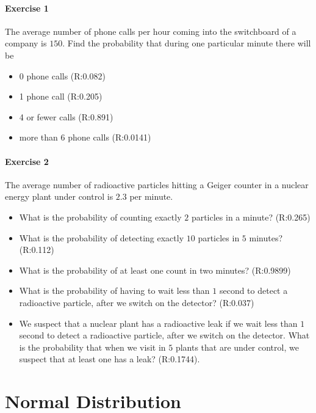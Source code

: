 \documentclass[
]{book}
\providecommand{\tightlist}{%
  \setlength{\itemsep}{0pt}\setlength{\parskip}{0pt}}
\begin{document}
\hypertarget{exercise-1-5}{%
\subsubsection{Exercise 1}\label{exercise-1-5}}

The average number of phone calls per hour coming into the switchboard of a company is \(150\). Find the probability that during one particular minute there will be

\begin{itemize}
\tightlist
\item
  0 phone calls (R:0.082)
\item
  1 phone call (R:0.205)
\item
  4 or fewer calls (R:0.891)
\item
  more than 6 phone calls (R:0.0141)
\end{itemize}

\hypertarget{exercise-2-5}{%
\subsubsection{Exercise 2}\label{exercise-2-5}}

The average number of radioactive particles hitting a Geiger counter in a nuclear energy plant under control is \(2.3\) per minute.

\begin{itemize}
\item
  What is the probability of counting exactly \(2\) particles in a minute? (R:0.265)
\item
  What is the probability of detecting exactly \(10\) particles in \(5\) minutes? (R:0.112)
\item
  What is the probability of at least one count in two minutes? (R:0.9899)
\item
  What is the probability of having to wait less than \(1\) second to detect a radioactive particle, after we switch on the detector? (R:0.037)
\item
  We suspect that a nuclear plant has a radioactive leak if we wait less than \(1\) second to detect a radioactive particle, after we switch on the detector. What is the probability that when we visit in \(5\) plants that are under control, we suspect that at least one has a leak? (R:0.1744).
\end{itemize}

\hypertarget{normal-distribution}{%
\chapter{Normal Distribution}\label{normal-distribution}}
\end{document}
